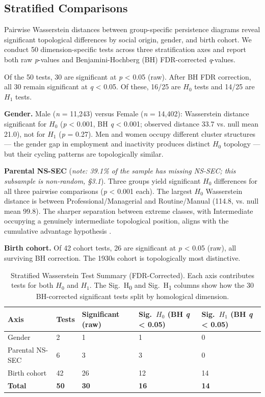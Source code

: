 \subsection{Stratified Comparisons}

Pairwise Wasserstein distances between group-specific persistence diagrams reveal significant topological differences by social origin, gender, and birth cohort. We conduct 50 dimension-specific tests across three stratification axes and report both raw \textit{p}-values and Benjamini-Hochberg (BH) FDR-corrected \textit{q}-values.

Of the 50 tests, 30 are significant at \textit{p} < 0.05 (raw). After BH FDR correction, all 30 remain significant at \textit{q} < 0.05. Of these, 16/25 are $H_0$ tests and 14/25 are $H_1$ tests.

\textbf{Gender.} Male (\textit{n} = 11,243) versus Female (\textit{n} = 14,402): Wasserstein distance significant for $H_0$ (\textit{p} < 0.001, BH \textit{q} < 0.001; observed distance 33.7 vs. null mean 21.0), not for $H_1$ (\textit{p} = 0.27). Men and women occupy different cluster structures --- the gender gap in employment and inactivity produces distinct $H_0$ topology --- but their cycling patterns are topologically similar.

\textbf{Parental NS-SEC} (\textit{note: 39.1\% of the sample has missing NS-SEC; this subsample is non-random, \S3.1}). Three groups yield significant $H_0$ differences for all three pairwise comparisons (\textit{p} < 0.001 each). The largest $H_0$ Wasserstein distance is between Professional/Managerial and Routine/Manual (114.8, vs. null mean 99.8). The sharper separation between extreme classes, with Intermediate occupying a genuinely intermediate topological position, aligns with the cumulative advantage hypothesis \citep{diprete2006cumulative}.

\textbf{Birth cohort.} Of 42 cohort tests, 26 are significant at \textit{p} < 0.05 (raw), all surviving BH correction. The 1930s cohort is topologically most distinctive.

\begin{table}[htbp]
\centering
\caption{Stratified Wasserstein Test Summary (FDR-Corrected). Each axis contributes tests for both $H_0$ and $H_1$. The Sig.\ H\textsubscript{0} and Sig.\ H\textsubscript{1} columns show how the 30 BH-corrected significant tests split by homological dimension.}
\label{tab:stratified}
\begin{tabular}{lllll}
\toprule
Axis & Tests & Significant (raw) & Sig.\ $H_0$ (BH \textit{q} < 0.05) & Sig.\ $H_1$ (BH \textit{q} < 0.05) \\
\midrule
Gender & 2 & 1 & 1 & 0 \\
Parental NS-SEC & 6 & 3 & 3 & 0 \\
Birth cohort & 42 & 26 & 12 & 14 \\
\textbf{Total} & \textbf{50} & \textbf{30} & \textbf{16} & \textbf{14} \\
\bottomrule
\end{tabular}
\end{table}

